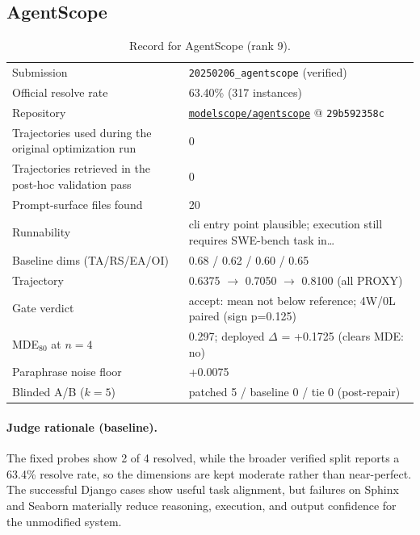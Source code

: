 \subsection{AgentScope}
\label{app:agent9}
\begin{table}[h]\centering\scriptsize
\caption{Record for AgentScope (rank 9).}
\begin{tabular}{lp{8.2cm}}\toprule
Submission & \texttt{20250206\_\allowbreak{}agentscope} (verified) \\
Official resolve rate & 63.40\% (317 instances) \\
Repository & \href{https://github.com/modelscope/agentscope}{\texttt{modelscope/agentscope}} @ \texttt{29b592358c} \\
Trajectories used during the original optimization run & 0 \\
Trajectories retrieved in the post-hoc validation pass & 0 \\
Prompt-surface files found & 20 \\
Runnability & cli entry point plausible; execution still requires SWE-bench task in\ldots{} \\
Baseline dims (TA/RS/EA/OI) & 0.68 / 0.62 / 0.60 / 0.65 \\
Trajectory & 0.6375 $\to$ 0.7050 $\to$ 0.8100 (all PROXY) \\
Gate verdict & accept: mean not below reference; 4W/0L paired (sign p=0.125) \\
MDE$_{80}$ at $n{=}4$ & 0.297; deployed $\Delta$ = +0.1725 (clears MDE: no) \\
Paraphrase noise floor & +0.0075 \\
Blinded A/B ($k{=}5$) & patched 5 / baseline 0 / tie 0 (post-repair) \\
\bottomrule\end{tabular}\end{table}
\paragraph{Judge rationale (baseline).}
The fixed probes show 2 of 4 resolved, while the broader verified split reports a 63.4\% resolve rate, so the dimensions are kept moderate rather than near-perfect. The successful Django cases show useful task alignment, but failures on Sphinx and Seaborn materially reduce reasoning, execution, and output confidence for the unmodified system.
